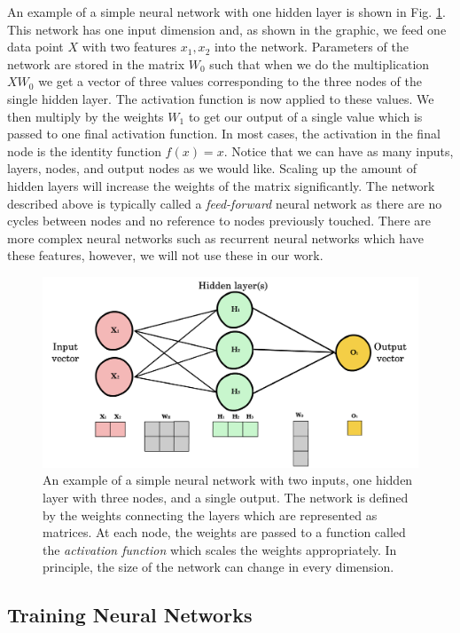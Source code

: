 \documentclass{CUP-JNL-DTM}%
\theoremstyle{definition}
\numberwithin{equation}{section}
\begin{document}
An example of a simple neural network with one hidden layer is shown in Fig. \ref{fig:NNexample}. This network has one input dimension and, as shown in the graphic, we feed one data point $X$ with two features $x_1, x_2$ into the network. Parameters of the network are stored in the matrix $W_0$ such that when we do the multiplication $X W_0$ we get a vector of three values corresponding to the three nodes of the single hidden layer. The activation function is now applied to these values. We then multiply by the weights $W_1$ to get our output of a single value which is passed to one final activation function. In most cases, the activation in the final node is the identity function $f(x) = x$. Notice that we can have as many inputs, layers, nodes, and output nodes as we would like. Scaling up the amount of hidden layers will increase the weights of the matrix significantly. The network described above is typically called a \emph{feed-forward} neural network as there are no cycles between nodes and no reference to nodes previously touched. There are more complex neural networks such as recurrent neural networks which have these features, however, we will not use these in our work.

\begin{figure}
\centering
\includegraphics[width=0.7\linewidth]{figures/NN_example.png}
\caption{An example of a simple neural network with two inputs, one hidden layer with three nodes, and a single output. The network is defined by the weights connecting the layers which are represented as matrices. At each node, the weights are passed to a function called the \emph{activation function} which scales the weights appropriately. In principle, the size of the network can change in every dimension. }
\label{fig:NNexample}
\end{figure}



\subsection{Training Neural Networks}
\end{document}
